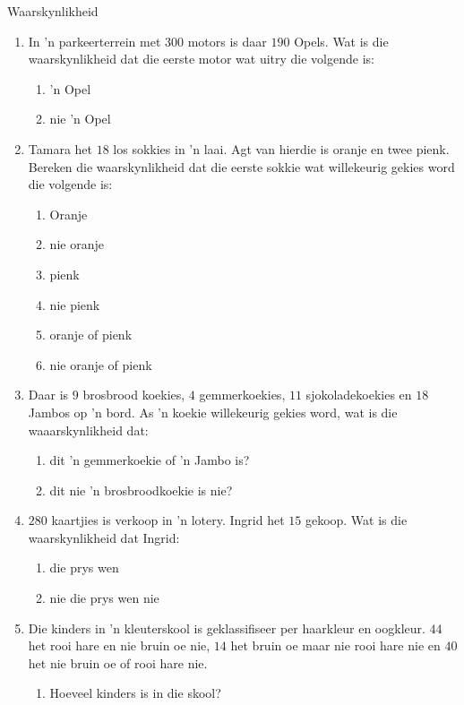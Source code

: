 \begin{eocexercises}{Waarskynlikheid}
\begin{enumerate}[itemsep=5pt, label=\textbf{\arabic*}.]
  \item In 'n parkeerterrein met $300$ motors is daar $190$ Opels. Wat is die waarskynlikheid dat die eerste motor wat uitry die volgende is:
    \begin{enumerate}[noitemsep, label=\textbf{(\alph*)} ]
    \item 'n Opel
    \item nie 'n Opel
    \end{enumerate}
  \item Tamara het $18$ los sokkies in 'n laai. Agt van hierdie is oranje en twee pienk. Bereken die waarskynlikheid dat die eerste sokkie wat willekeurig gekies word die volgende is:
    \begin{enumerate}[noitemsep, label=\textbf{(\alph*)} ]
    \item Oranje
    \item nie oranje
    \item pienk
    \item nie pienk
    \item oranje of pienk
    \item nie oranje of pienk
    \end{enumerate}
  \item Daar is $9$ brosbrood koekies, $4$ gemmerkoekies,
    $11$ sjokoladekoekies en $18$ Jambos op 'n bord. As 'n koekie willekeurig gekies word, wat is die waaarskynlikheid dat:
    \begin{enumerate}[noitemsep, label=\textbf{(\alph*)} ]
    \item dit 'n gemmerkoekie of 'n Jambo is?
    \item dit nie 'n brosbroodkoekie is nie?
    \end{enumerate}
  \item $280$ kaartjies is verkoop in 'n lotery. Ingrid het $15$ gekoop. Wat is die waarskynlikheid dat Ingrid:
    \begin{enumerate}[noitemsep, label=\textbf{(\alph*)} ]
    \item die prys wen
    \item nie die prys wen nie
    \end{enumerate}
  \item Die kinders in 'n kleuterskool is geklassifiseer per haarkleur en oogkleur. $44$ het rooi hare en nie bruin oe nie, $14$ het bruin oe maar nie rooi hare nie en $40$ het nie bruin oe of rooi hare nie.
    \begin{enumerate}[noitemsep, label=\textbf{(\alph*)} ]
    \item Hoeveel kinders is in die skool?

\end{enumerate}
\end{enumerate}
\end{eocexercises}
